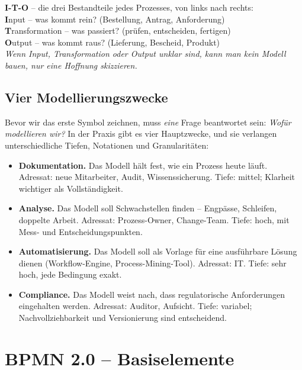 \documentclass[11pt,a4paper,oneside]{article}
\newcommand{\caveatfontfallback}{\itshape}
\newcommand\caveatfont{\caveatfontfallback}%
\newcommand{\akzent}[1]{{\caveatfont\color{lpAmber}#1}}
\newcommand{\fachbegriff}[1]{\textbf{#1}}
\begin{document}
\begin{eselsbox}[Eselsbrücke: \akzent{I-T-O}]
\textbf{I-T-O} -- die drei Bestandteile jedes Prozesses, von links nach rechts:\\[2pt]
\textbf{I}nput -- was kommt rein? (Bestellung, Antrag, Anforderung)\\
\textbf{T}ransformation -- was passiert? (prüfen, entscheiden, fertigen)\\
\textbf{O}utput -- was kommt raus? (Lieferung, Bescheid, Produkt)\\[2pt]
\emph{Wenn Input, Transformation oder Output unklar sind, kann man kein Modell bauen, nur eine Hoffnung skizzieren.}
\end{eselsbox}

\subsection{Vier Modellierungszwecke}

Bevor wir das erste Symbol zeichnen, muss \emph{eine} Frage beantwortet sein: \emph{Wofür modellieren wir?} In der Praxis gibt es vier Hauptzwecke, und sie verlangen unterschiedliche Tiefen, Notationen und Granularitäten:

\begin{itemize}
  \item \fachbegriff{Dokumentation.} Das Modell hält fest, wie ein Prozess heute läuft. Adressat: neue Mitarbeiter, Audit, Wissenssicherung. Tiefe: mittel; Klarheit wichtiger als Vollständigkeit.
  \item \fachbegriff{Analyse.} Das Modell soll Schwachstellen finden -- Engpässe, Schleifen, doppelte Arbeit. Adressat: Prozess-Owner, Change-Team. Tiefe: hoch, mit Mess- und Entscheidungspunkten.
  \item \fachbegriff{Automatisierung.} Das Modell soll als Vorlage für eine ausführbare Lösung dienen (Workflow-Engine, Process-Mining-Tool). Adressat: IT. Tiefe: sehr hoch, jede Bedingung exakt.
  \item \fachbegriff{Compliance.} Das Modell weist nach, dass regulatorische Anforderungen eingehalten werden. Adressat: Auditor, Aufsicht. Tiefe: variabel; Nachvollziehbarkeit und Versionierung sind entscheidend.
\end{itemize}

\section{BPMN 2.0 -- Basiselemente}
\end{document}
